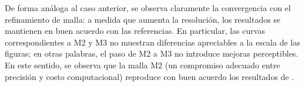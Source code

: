 De forma análoga al caso anterior, se observa claramente la convergencia con el refinamiento de malla: a medida que aumenta la resolución, los resultados se mantienen en buen acuerdo con las referencias. En particular, las curvas correspondientes a M2 y M3 no muestran diferencias apreciables a la escala de las figuras; en otras palabras, el paso de M2 a M3 no introduce mejoras perceptibles. En este sentido, se observa que la malla M2 (un compromiso adecuado entre precisión y costo computacional) reproduce con buen acuerdo los resultados de \cite{moser1999, kawamura2000dns}.



\begin{figure}[H]
 \centering


\end{figure}
